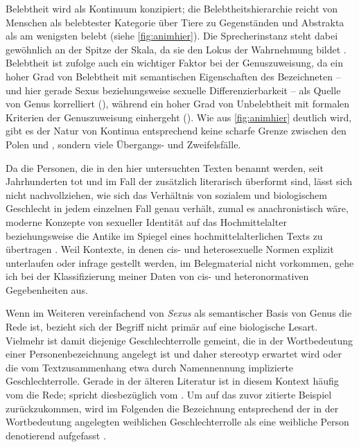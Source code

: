 Belebtheit wird als Kontinuum konzipiert; die Belebtheitshierarchie reicht von
Menschen als belebtester Kategorie über Tiere zu Gegenständen und Abstrakta als
am wenigsten belebt (siehe \cref{fig:animhier}). Die Sprecherinstanz steht
dabei gewöhnlich an der Spitze der Skala, da sie den Lokus der Wahrnehmung
bildet \autocites%
	{silverstein1976}%
	[185--200]{comrie1989}%
	[203]{bossong1998}%
	[40--46]{siewierska2004}%
	[439--441]{bickel2011}%
	[63--79]{kotthoffnuebling2018}. %
Belebtheit ist \citet[101--102, 110--112]{dahl1999} zufolge auch ein wichtiger
Faktor bei der Genuszuweisung, da ein hoher Grad von Belebtheit mit
semantischen Eigenschaften des Bezeichneten -- und hier gerade Sexus
beziehungsweise sexuelle Differenzierbarkeit -- als Quelle von Genus
korrelliert (), während ein hoher Grad von Unbelebtheit
mit formalen Kriterien der Genuszuweisung einhergeht (). Wie
aus \cref{fig:animhier} deutlich wird, gibt es der Natur von Kontinua
entsprechend keine scharfe Grenze zwischen den Polen
\leipzigfont{[+\,belebt]} und \leipzigfont{[-\,belebt]}, sondern viele
Übergangs- und Zweifelsfälle.

Da die Personen, die in den hier untersuchten Texten benannt werden, seit
Jahrhunderten tot und im Fall der  zusätzlich literarisch
überformt sind, lässt sich nicht nachvollziehen, wie sich das Verhältnis von
sozialem und biologischem Geschlecht in jedem einzelnen Fall genau verhält,
zumal es anachronistisch wäre, moderne Konzepte von sexueller Identität auf das
Hochmittelalter beziehungsweise die Antike im Spiegel eines
hochmittelalterlichen Texts zu übertragen \autocite[siehe
z.\,B.][]{klinger2002}. Weil Kontexte, in denen cis- und heterosexuelle Normen
explizit unterlaufen oder infrage gestellt werden, im Belegmaterial nicht
vorkommen, gehe ich bei der Klassifizierung meiner Daten von cis- und
heteronormativen Gegebenheiten aus.

Wenn im Weiteren vereinfachend von \textit{Sexus} als semantischer Basis von
Genus die Rede ist, bezieht sich der Begriff nicht primär auf eine biologische
Lesart. Vielmehr ist damit diejenige Geschlechter\-rolle gemeint, die in der
Wortbedeutung einer Personenbezeichnung angelegt ist und daher stereotyp
erwartet wird oder die vom Textzusammenhang etwa durch Namennennung implizierte
Geschlechterrolle. Gerade in der älteren Literatur ist in diesem Kontext häufig
vom  die Rede; \citet[67]{panther2009} spricht
diesbezüglich vom . Um auf das zuvor zitierte Beispiel
zurückzukommen, wird im Folgenden die Bezeichnung  entsprechend der
in der Wortbedeutung angelegten weiblichen Geschlechterrolle als eine weibliche
Person denotierend aufgefasst \autocite[vgl.][\pno~]{duden-online}.

